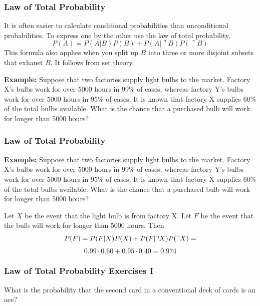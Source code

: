\documentclass[xcolor=dvipsnames]{beamer}
\begin{document}
\begin{frame}
  \frametitle{Law of Total Probability}
It is often easier to calculate conditional probabilities than
unconditional probabilities. To express one by the other use the
\alert{law of total probability},
\begin{equation}
  \label{eq:aefengah}
  P(A)=P(A|B)P(B)+P(A|\urcorner{}B)P(\urcorner{}B)
\end{equation}
This formula also applies when you split up $B$ into three or more
disjoint subsets that exhaust $B$. It follows from set theory.

\bigskip

\textbf{Example: }Suppose that two factories supply light bulbs to the
market. Factory X's bulbs work for over 5000 hours in 99\% of cases,
whereas factory Y's bulbs work for over 5000 hours in 95\% of cases.
It is known that factory X supplies 60\% of the total bulbs available.
What is the chance that a purchased bulb will work for longer than
5000 hours?
\end{frame}

\begin{frame}
  \frametitle{Law of Total Probability}
\textbf{Example: }Suppose that two factories supply light bulbs to the
market. Factory X's bulbs work for over 5000 hours in 99\% of cases,
whereas factory Y's bulbs work for over 5000 hours in 95\% of cases.
It is known that factory X supplies 60\% of the total bulbs available.
What is the chance that a purchased bulb will work for longer than
5000 hours?

\bigskip

Let $X$ be the event that the light bulb is from factory X. Let $F$ be
the event that the bulb will work for longer than
5000 hours. Then
\begin{equation}
  \label{eq:uwahiamo}
  P(F)=P(F|X)P(X)+P(F|\urcorner{}X)P(\urcorner{}X)=\notag
\end{equation}
\begin{equation}
  \label{eq:siecafoo}
  0.99\cdot{}0.60+0.95\cdot{}0.40=0.974
\end{equation}
\end{frame}

\begin{frame}
  \frametitle{Law of Total Probability Exercises I}
What is the probability that the second card in a conventional
deck of cards is an ace?
\end{frame}
\end{document}
